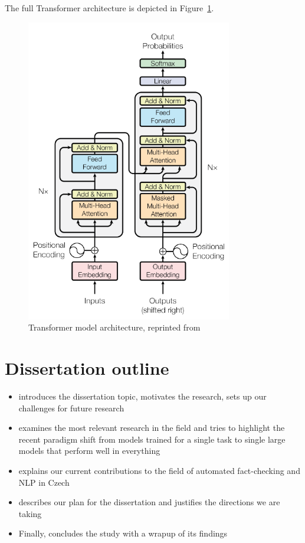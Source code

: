 The full Transformer architecture is depicted in Figure~\ref{fig:transformer}.

\begin{figure}
    \includegraphics[width=9cm]{fig/transformer.pdf}
    \caption{Transformer model architecture, reprinted from~\cite{vaswani}}
    \label{fig:transformer}
    \end{figure}

\section{Dissertation outline}
 
\begin{itemize}
\item {} introduces the dissertation topic, motivates the research, sets up our challenges for future research 

\item {} examines the most relevant research in the field and tries to highlight the recent paradigm shift from models trained for a single task to single large models that perform well in everything

\item {} explains our current contributions to the field of automated fact-checking and NLP in Czech

\item {} describes our plan for the dissertation and justifies the directions we are taking

\item Finally, {} concludes the study with a wrapup of its findings

\end{itemize}

